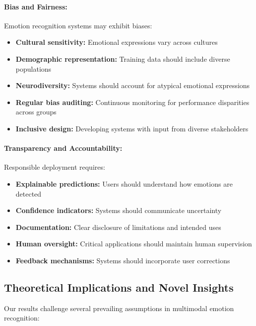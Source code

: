 \documentclass[12pt]{article}
\begin{document}
\paragraph{Bias and Fairness:}
Emotion recognition systems may exhibit biases:

\begin{itemize}
    \item \textbf{Cultural sensitivity:} Emotional expressions vary across cultures
    
    \item \textbf{Demographic representation:} Training data should include diverse populations
    
    \item \textbf{Neurodiversity:} Systems should account for atypical emotional expressions
    
    \item \textbf{Regular bias auditing:} Continuous monitoring for performance disparities across groups
    
    \item \textbf{Inclusive design:} Developing systems with input from diverse stakeholders
\end{itemize}

\paragraph{Transparency and Accountability:}
Responsible deployment requires:

\begin{itemize}
    \item \textbf{Explainable predictions:} Users should understand how emotions are detected
    
    \item \textbf{Confidence indicators:} Systems should communicate uncertainty
    
    \item \textbf{Documentation:} Clear disclosure of limitations and intended uses
    
    \item \textbf{Human oversight:} Critical applications should maintain human supervision
    
    \item \textbf{Feedback mechanisms:} Systems should incorporate user corrections
\end{itemize}

\subsection{Theoretical Implications and Novel Insights}
Our results challenge several prevailing assumptions in multimodal emotion recognition:
\end{document}
